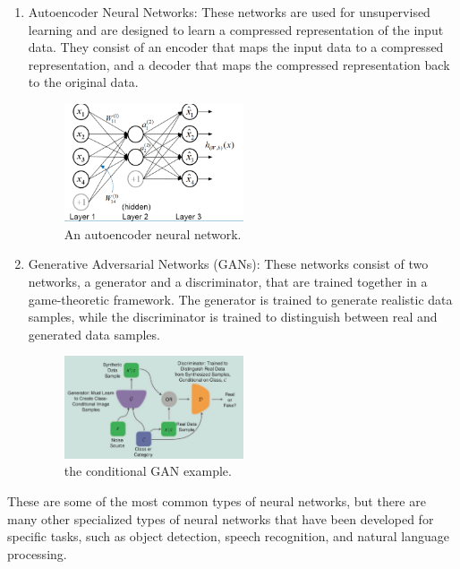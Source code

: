 \begin{enumerate}
\begin{center}
    \end{center}
    \item Autoencoder Neural Networks: These networks are used for unsupervised learning and are designed to
    learn a compressed representation of the input data. They consist of an encoder that maps the input data
    to a compressed representation, and a decoder that maps the compressed representation back to the original data.
    \begin{center}
        \begin{figure}[!ht]
            \centering
            \includegraphics[width=0.5\textwidth]{figures/ann}
            \caption{An autoencoder neural network. \cite{luo2018distributed}}
            \label{fig:ann}
        \end{figure}
    \end{center}
    \item Generative Adversarial Networks (GANs): These networks consist of two networks, a generator and a discriminator,
    that are trained together in a game-theoretic framework. The generator is trained to generate realistic data samples,
    while the discriminator is trained to distinguish between real and generated data samples.
    \begin{center}
        \begin{figure}[!ht]
            \centering
            \includegraphics[width=0.5\textwidth]{figures/gan}
            \caption{the conditional GAN example. \cite{creswell2018generative}}
            \label{fig:ann}
        \end{figure}
    \end{center}
\end{enumerate}
These are some of the most common types of neural networks, but there are many other specialized types of neural
networks that have been developed for specific tasks, such as object detection, speech recognition, and
natural language processing.\\

